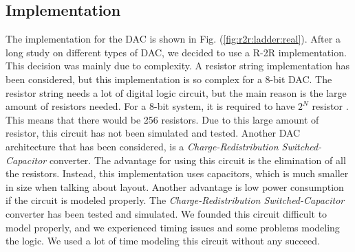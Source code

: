 \documentclass[english, 12pt, a4paper]{ifimaster}
\begin{document}
\subsection{Implementation}
The implementation for the DAC is shown in Fig. (\ref{fig:r2r:ladder:real}). After a long study on different types of DAC, we decided to use a R-2R implementation. This decision was mainly due to 
complexity. A resistor string implementation has been considered, but this implementation is so complex for a 8-bit DAC. The resistor string needs a lot of digital logic circuit, but the main 
reason is the large amount of resistors needed. For a 8-bit system, it is required to have \(2^N\) resistor \cite{carusone}. This means that there would be 256 resistors. Due to this large amount of resistor, 
this circuit has not been simulated and tested. Another DAC architecture that has been considered, is a \textit{Charge-Redistribution Switched-Capacitor} converter. The advantage for using this circuit 
is the elimination of all the resistors. Instead, this implementation uses capacitors, which is much smaller in size when talking about layout. Another advantage is low power consumption if the
circuit is modeled properly. The \textit{Charge-Redistribution Switched-Capacitor} converter has been tested and simulated. We founded this circuit difficult to model properly, and we experienced 
timing issues and some problems modeling the logic. We used a lot of time modeling this circuit without any succeed.\\
\end{document}
